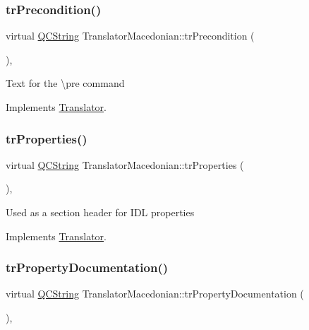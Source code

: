 \subsubsection{\texorpdfstring{trPrecondition()}{trPrecondition()}}
{\footnotesize\ttfamily virtual \mbox{\hyperlink{class_q_c_string}{Q\+C\+String}} Translator\+Macedonian\+::tr\+Precondition (\begin{DoxyParamCaption}{ }\end{DoxyParamCaption})\hspace{0.3cm}{\ttfamily [inline]}, {\ttfamily [virtual]}}

Text for the \textbackslash{}pre command 

Implements \mbox{\hyperlink{class_translator}{Translator}}.

\mbox{\label{class_translator_macedonian_a6a548bf4047b1f6779108a34b907ac5f}} 
\subsubsection{\texorpdfstring{trProperties()}{trProperties()}}
{\footnotesize\ttfamily virtual \mbox{\hyperlink{class_q_c_string}{Q\+C\+String}} Translator\+Macedonian\+::tr\+Properties (\begin{DoxyParamCaption}{ }\end{DoxyParamCaption})\hspace{0.3cm}{\ttfamily [inline]}, {\ttfamily [virtual]}}

Used as a section header for I\+DL properties 

Implements \mbox{\hyperlink{class_translator}{Translator}}.

\mbox{\label{class_translator_macedonian_a585037d6f5dd384c7eb8c66654e253d1}} 
\subsubsection{\texorpdfstring{trPropertyDocumentation()}{trPropertyDocumentation()}}
{\footnotesize\ttfamily virtual \mbox{\hyperlink{class_q_c_string}{Q\+C\+String}} Translator\+Macedonian\+::tr\+Property\+Documentation (\begin{DoxyParamCaption}{ }\end{DoxyParamCaption})\hspace{0.3cm}{\ttfamily [inline]}, {\ttfamily [virtual]}}

